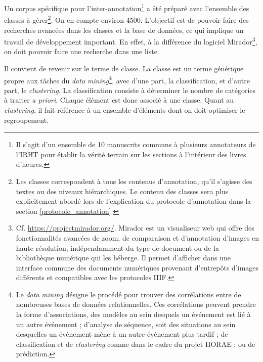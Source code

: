 \documentclass[a4paper,12pt,twoside]{book}
\begin{document}
	Un corpus spécifique pour l'inter-annotation\footnote{Il s'agit d'un ensemble de 10 manuscrits communs à plusieurs annotateurs de l'IRHT pour établir la vérité terrain sur les sections à l'intérieur des livres d'heures.} a été préparé avec l’ensemble des classes à gérer\footnote{Les classes correspondent à tous les contenus d'annotation, qu’il s’agisse des textes ou des niveaux hiérarchiques. Le contenu des classes sera plus explicitement abordé lors de l'explication du protocole d'annotation dans la section \ref{protocole_annotation}.}. On en compte environ 4500. L’objectif est de pouvoir faire des recherches avancées dans les classes et la base de données, ce qui implique un travail de développement important. En effet, à la différence du logiciel Mirador\footnote{Cf. \url{https://projectmirador.org/}. Mirador est un visualiseur web qui offre des fonctionnalités avancées de zoom, de comparaison et d'annotation d’images en haute résolution, indépendamment du type de document ou de la bibliothèque numérique qui les héberge. Il permet d'afficher dans une interface commune des documents numériques provenant d'entrepôts d'images différents et compatibles avec les protocoles IIIF.}, on doit pouvoir faire une recherche dans une liste. 
	
Il convient de revenir sur le terme de \og classe\fg{}. La classe est un terme générique propre aux tâches du \textit{data mining}\footnote{Le \textit{data mining} désigne le procédé pour trouver des corrélations entre de nombreuses bases de données relationnelles. Ces corrélations peuvent prendre la forme d'associations, des modèles au sein desquels un événement est lié à un autre événement ; d'analyse de séquence, soit des situations au sein desquelles un événement mène à un autre événement plus tardif ; de classification et de \textit{clustering} comme dans le cadre du projet HORAE ; ou de prédiction.}, avec d’une part, la classification, et d’autre part, le \textit{clustering}. La classification consiste à déterminer le nombre de catégories à traiter \textit{a priori}. Chaque élément est donc associé à une classe. Quant au \textit{clustering}, il fait référence à un ensemble d’éléments dont on doit optimiser le regroupement.\\
\end{document}
